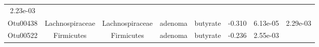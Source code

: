 \documentclass[11pt,]{article}
\begin{document}
\begin{longtable}[]{@{}cccccccc@{}}
\begin{minipage}[t]{0.08\columnwidth}
2.23e-03\strut
\end{minipage}\tabularnewline
\begin{minipage}[t]{0.08\columnwidth}\centering\strut
Otu00438\strut
\end{minipage} & \begin{minipage}[t]{0.15\columnwidth}\centering\strut
Lachnospiraceae\strut
\end{minipage} & \begin{minipage}[t]{0.15\columnwidth}\centering\strut
Lachnospiraceae\strut
\end{minipage} & \begin{minipage}[t]{0.08\columnwidth}\centering\strut
adenoma\strut
\end{minipage} & \begin{minipage}[t]{0.09\columnwidth}\centering\strut
butyrate\strut
\end{minipage} & \begin{minipage}[t]{0.07\columnwidth}\centering\strut
-0.310\strut
\end{minipage} & \begin{minipage}[t]{0.08\columnwidth}\centering\strut
6.13e-05\strut
\end{minipage} & \begin{minipage}[t]{0.08\columnwidth}\centering\strut
2.29e-03\strut
\end{minipage}\tabularnewline
\begin{minipage}[t]{0.08\columnwidth}\centering\strut
Otu00522\strut
\end{minipage} & \begin{minipage}[t]{0.15\columnwidth}\centering\strut
Firmicutes\strut
\end{minipage} & \begin{minipage}[t]{0.15\columnwidth}\centering\strut
Firmicutes\strut
\end{minipage} & \begin{minipage}[t]{0.08\columnwidth}\centering\strut
adenoma\strut
\end{minipage} & \begin{minipage}[t]{0.09\columnwidth}\centering\strut
butyrate\strut
\end{minipage} & \begin{minipage}[t]{0.07\columnwidth}\centering\strut
-0.236\strut
\end{minipage} & \begin{minipage}[t]{0.08\columnwidth}\centering\strut
2.55e-03\strut
\end{minipage} & \begin{minipage}[t]{0.08\columnwidth}\centering\strut

\end{minipage}
\end{longtable}
\end{document}
